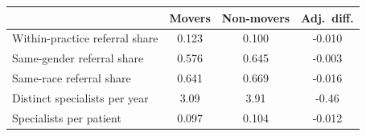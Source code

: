 \begin{tabular}{lccc}
\toprule
 & Movers & Non-movers & Adj.\ diff. \\
\midrule
Within-practice referral share & 0.123 & 0.100 & -0.010 \\
Same-gender referral share & 0.576 & 0.645 & -0.003 \\
Same-race referral share & 0.641 & 0.669 & -0.016 \\
Distinct specialists per year & 3.09 & 3.91 & -0.46 \\
Specialists per patient & 0.097 & 0.104 & -0.012 \\
\bottomrule
\end{tabular}
